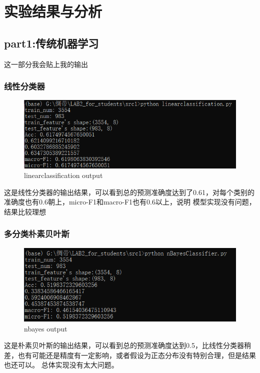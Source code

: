 \documentclass{report}
\begin{document}
    \chapter{实验结果与分析}
    \section{part1:传统机器学习}
    这一部分我会贴上我的输出\par 
    \subsection{线性分类器}
    \begin{figure}[H]
        \centering
        \includegraphics[width=15cm]{lc.png}
        \caption{linearclassification output}
    \end{figure}
    这是线性分类器的输出结果，可以看到总的预测准确度达到了0.61，对每个类别的准确度也有0.6朝上，micro-F1和macro-F1也有0.6以上，说明
    模型实现没有问题，结果比较理想\par 
    \subsection{多分类朴素贝叶斯}
    \begin{figure}[H]
        \centering
        \includegraphics[width=15cm]{nb.png}
        \caption{nbayes output}
    \end{figure}
    这是朴素贝叶斯的输出结果，可以看到总的预测准确度达到0.5，比线性分类器稍差，也有可能还是精度有一定影响，或者假设为正态分布没有特别合理，但是结果也还可以。
    总体实现没有太大问题。
\end{document}
